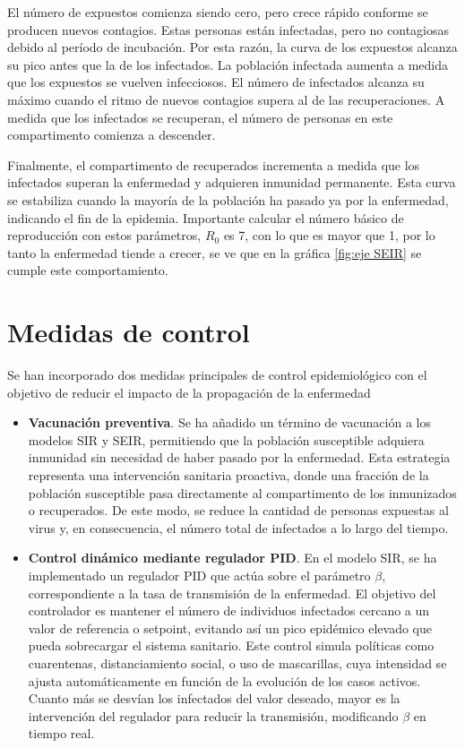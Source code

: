 El número de expuestos comienza siendo cero, pero crece rápido conforme se producen nuevos contagios. Estas personas están infectadas, pero no contagiosas debido al período de incubación. Por esta razón, la curva de los expuestos alcanza su pico antes que la de los infectados. 
La población infectada aumenta a medida que los expuestos se vuelven infecciosos. El número de infectados alcanza su máximo cuando el ritmo de nuevos contagios supera al de las recuperaciones. A medida que los infectados se recuperan, el número de personas en este compartimento comienza a descender.

Finalmente, el compartimento de recuperados incrementa a medida que los infectados superan la enfermedad y adquieren inmunidad permanente. Esta curva se estabiliza cuando la mayoría de la población ha pasado ya por la enfermedad, indicando el fin de la epidemia.
Importante calcular el número básico de reproducción con estos parámetros, $R_0$ es 7, con lo que es mayor que 1, por lo tanto la enfermedad tiende a crecer, se ve que en la gráfica \ref{fig:eje SEIR} se cumple este comportamiento.






\section{Medidas de control}

Se han incorporado dos medidas principales de control epidemiológico con el objetivo de reducir el impacto de la propagación de la enfermedad
\begin{itemize}
    \item \textbf{Vacunación preventiva}. Se ha añadido un término de vacunación a los modelos SIR y SEIR, permitiendo que la población susceptible adquiera inmunidad sin necesidad de haber pasado por la enfermedad. Esta estrategia representa una intervención sanitaria proactiva, donde una fracción de la población susceptible pasa directamente al compartimento de los inmunizados o recuperados. De este modo, se reduce la cantidad de personas expuestas al virus y, en consecuencia, el número total de infectados a lo largo del tiempo.
    \item \textbf{Control dinámico mediante regulador PID}. En el modelo SIR, se ha implementado un regulador PID que actúa sobre el parámetro $\beta$, correspondiente a la tasa de transmisión de la enfermedad. El objetivo del controlador es mantener el número de individuos infectados cercano a un valor de referencia o setpoint, evitando así un pico epidémico elevado que pueda sobrecargar el sistema sanitario.
   Este control simula políticas como cuarentenas, distanciamiento social, o uso de mascarillas, cuya intensidad se ajusta automáticamente en función de la evolución de los casos activos. Cuanto más se desvían los infectados del valor deseado, mayor es la intervención del regulador para reducir la transmisión, modificando $\beta$ en tiempo real.
\end{itemize}

